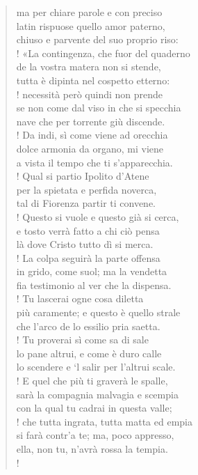 \documentclass[a4paper, twoside, titlepage]{book}
\begin{document}
\begin{verse}
ma per chiare parole e con preciso\\
latin rispuose quello amor paterno,\\
chiuso e parvente del suo proprio riso:\\!
«La contingenza, che fuor del quaderno\\
de la vostra matera non si stende,\\
tutta è dipinta nel cospetto etterno:\\!
necessità però quindi non prende\\
se non come dal viso in che si specchia\\
nave che per torrente giù discende.\\!
Da indi, sì come viene ad orecchia\\
dolce armonia da organo, mi viene\\
a vista il tempo che ti s’apparecchia.\\!
Qual si partio Ipolito d’Atene\\
per la spietata e perfida noverca,\\
tal di Fiorenza partir ti convene.\\!
Questo si vuole e questo già si cerca,\\
e tosto verrà fatto a chi ciò pensa\\
là dove Cristo tutto dì si merca.\\!
La colpa seguirà la parte offensa\\
in grido, come suol; ma la vendetta\\
fia testimonio al ver che la dispensa.\\!
Tu lascerai ogne cosa diletta\\
più caramente; e questo è quello strale\\
che l’arco de lo essilio pria saetta.\\!
Tu proverai sì come sa di sale\\
lo pane altrui, e come è duro calle\\
lo scendere e ‘l salir per l’altrui scale.\\!
E quel che più ti graverà le spalle,\\
sarà la compagnia malvagia e scempia\\
con la qual tu cadrai in questa valle;\\!
che tutta ingrata, tutta matta ed empia\\
si farà contr’a te; ma, poco appresso,\\
ella, non tu, n’avrà rossa la tempia.\\!

\end{verse}
\end{document}

